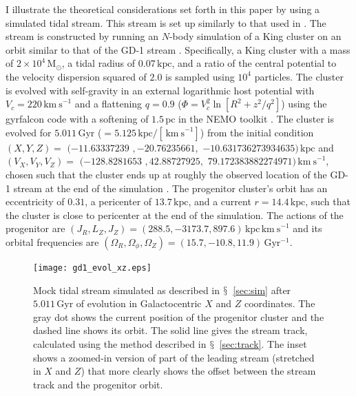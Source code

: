 \documentclass{emulateapj}
\newcommand{\sectionname}{$\mathsection$}
\newcommand{\Gyr}{\ensuremath{\,\mathrm{Gyr}}}
\newcommand{\kpc}{\ensuremath{\,\mathrm{kpc}}}
\newcommand{\pc}{\ensuremath{\,\mathrm{pc}}}
\newcommand{\kms}{\ensuremath{\,\mathrm{km\ s}^{-1}}}
\newcommand{\msun}{\ensuremath{\,\mathrm{M}_{\odot}}}
\newcommand{\inv}{\ensuremath{^{-1}}}
\begin{document}
I illustrate the theoretical considerations set forth in this paper by
using a simulated tidal stream. This stream is set up similarly to
that used in \citet{Sanders13b}. The stream is constructed by running
an $N$-body simulation of a King cluster \citep{King66a} on an orbit
similar to that of the GD-1 stream \citep{Koposov10a}. Specifically, a
King cluster with a mass of $2\times10^4\msun$, a tidal radius of
$0.07\kpc$, and a ratio of the central potential to the velocity
dispersion squared of $2.0$ is sampled using $10^4$ particles. The
cluster is evolved with self-gravity in an external logarithmic host
potential with $V_c = 220\kms$ and a flattening $q=0.9$ ($\Phi = V_c^2
\ln [R^2 + z^2/q^2]$) using the gyrfalcon code
\citep{Dehnen00a,Dehnen02a} with a softening of $1.5\pc$ in the NEMO
toolkit \citep{Teuben95a}. The cluster is evolved for $5.011\Gyr$
($=5.125\kpc/[\kms]$) from the initial condition $(X,Y,Z) =$
$(-11.63337239$ $,-20.76235661,$ $-10.631736273934635)\kpc$ and
$(V_X,V_Y,V_Z) = $ $(-128.8281653$ $,42.88727925,$ $79.172383882274971)\kms$,
chosen such that the cluster ends up at roughly the observed location
of the GD-1 stream at the end of the simulation
\citep{Koposov10a}. The progenitor cluster's orbit has an eccentricity
of $0.31$, a pericenter of $13.7\kpc$, and a current $r=14.4\kpc$,
such that the cluster is close to pericenter at the end of the
simulation. The actions of the progenitor are $(J_R,L_Z,J_Z) =
(288.5,-3173.7,897.6)\kpc\kms$ and its orbital frequencies are
$(\Omega_R,\Omega_\phi,\Omega_Z) = (15.7,-10.8,11.9)\Gyr\inv$.

\begin{figure}[t!]
  \texttt{[image: gd1\_evol\_xz.eps]}
  \caption{Mock tidal stream simulated as described in
    \sectionname~\ref{sec:sim} after $5.011\Gyr$ of evolution in
    Galactocentric $X$ and $Z$ coordinates. The gray dot shows the
    current position of the progenitor cluster and the dashed line
    shows its orbit. The solid line gives the stream track, calculated
    using the method described in \sectionname~\ref{sec:track}. The
    inset shows a zoomed-in version of part of the leading stream
    (stretched in $X$ and $Z$) that more clearly shows the offset
    between the stream track and the progenitor
    orbit.}\label{fig:gd1_xz}
\end{figure}
\end{document}
